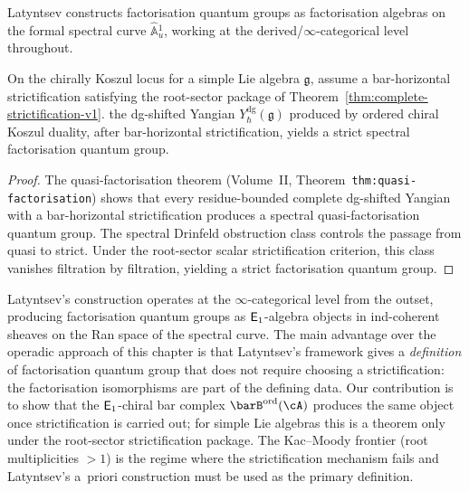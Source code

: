 Latyntsev constructs factorisation quantum groups as factorisation
algebras on the formal spectral curve $\widehat{\mathbb{A}}{}^1_u$,
working at the derived/$\infty$-categorical level throughout.

\begin{theorem}
\label{thm:factorisation-identification}
On the chirally Koszul locus for a simple Lie algebra $\mathfrak{g}$,
assume a bar-horizontal strictification satisfying the root-sector
package of Theorem~\textup{\ref{thm:complete-strictification-v1}}.
the dg-shifted Yangian $Y^{\mathrm{dg}}_\hbar(\mathfrak{g})$ produced
by ordered chiral Koszul duality, after bar-horizontal strictification,
yields a strict spectral factorisation quantum group.
\end{theorem}

\begin{proof}
The quasi-factorisation theorem (Volume~II,
Theorem~\texttt{thm:quasi-factorisation})
shows that every residue-bounded complete dg-shifted Yangian with a
bar-horizontal strictification produces a spectral quasi-factorisation
quantum group. The spectral Drinfeld obstruction class controls the
passage from quasi to strict. Under the root-sector scalar
strictification criterion, this class vanishes filtration by
filtration, yielding a strict factorisation quantum group.
\end{proof}

\begin{remark}
Latyntsev's construction operates at the $\infty$-categorical level from the
outset, producing factorisation quantum groups as $\mathsf{E}_1$-algebra objects in
ind-coherent sheaves on the Ran space of the spectral curve. The main
advantage over the operadic approach of this chapter is that Latyntsev's
framework gives a \emph{definition} of factorisation quantum group that does
not require choosing a strictification: the factorisation isomorphisms are
part of the defining data. Our contribution is to show that the
$\mathsf{E}_1$-chiral bar complex $\barB^{\mathrm{ord}}(\cA)$
produces the same object once strictification is carried out; for
simple Lie algebras this is a theorem only under the root-sector
strictification package. The
Kac--Moody frontier (root multiplicities $>1$) is the regime where the
strictification mechanism fails and Latyntsev's a~priori construction
must be used as the primary definition.
\end{remark}

